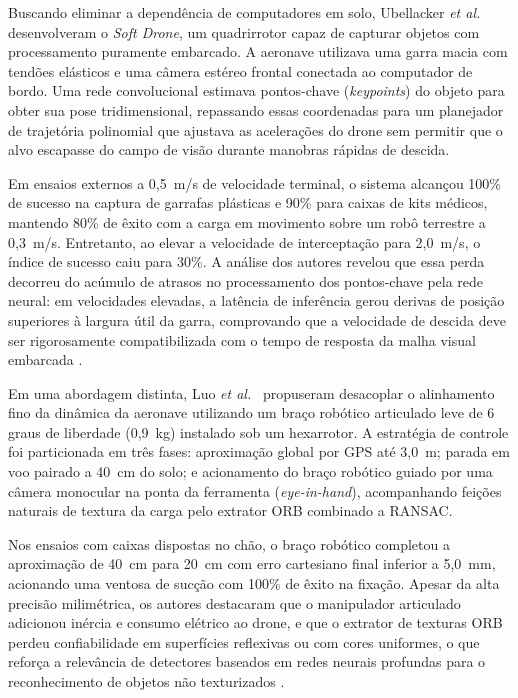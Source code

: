 Buscando eliminar a dependência de computadores em solo, Ubellacker \textit{et al.}~\cite{ubellacker2024} desenvolveram o \textit{Soft Drone}, um quadrirrotor capaz de capturar objetos com processamento puramente embarcado. A aeronave utilizava uma garra macia com tendões elásticos e uma câmera estéreo frontal conectada ao computador de bordo. Uma rede convolucional estimava pontos-chave (\textit{keypoints}) do objeto para obter sua pose tridimensional, repassando essas coordenadas para um planejador de trajetória polinomial que ajustava as acelerações do drone sem permitir que o alvo escapasse do campo de visão durante manobras rápidas de descida.

Em ensaios externos a 0,5~m/s de velocidade terminal, o sistema alcançou 100\% de sucesso na captura de garrafas plásticas e 90\% para caixas de kits médicos, mantendo 80\% de êxito com a carga em movimento sobre um robô terrestre a 0,3~m/s. Entretanto, ao elevar a velocidade de interceptação para 2,0~m/s, o índice de sucesso caiu para 30\%. A análise dos autores revelou que essa perda decorreu do acúmulo de atrasos no processamento dos pontos-chave pela rede neural: em velocidades elevadas, a latência de inferência gerou derivas de posição superiores à largura útil da garra, comprovando que a velocidade de descida deve ser rigorosamente compatibilizada com o tempo de resposta da malha visual embarcada \cite{ubellacker2024}.

Em uma abordagem distinta, Luo \textit{et al.}~\cite{luo2020} propuseram desacoplar o alinhamento fino da dinâmica da aeronave utilizando um braço robótico articulado leve de 6 graus de liberdade (0,9~kg) instalado sob um hexarrotor. A estratégia de controle foi particionada em três fases: aproximação global por GPS até 3,0~m; parada em voo pairado a 40~cm do solo; e acionamento do braço robótico guiado por uma câmera monocular na ponta da ferramenta (\textit{eye-in-hand}), acompanhando feições naturais de textura da carga pelo extrator ORB combinado a RANSAC.

Nos ensaios com caixas dispostas no chão, o braço robótico completou a aproximação de 40~cm para 20~cm com erro cartesiano final inferior a 5,0~mm, acionando uma ventosa de sucção com 100\% de êxito na fixação. Apesar da alta precisão milimétrica, os autores destacaram que o manipulador articulado adicionou inércia e consumo elétrico ao drone, e que o extrator de texturas ORB perdeu confiabilidade em superfícies reflexivas ou com cores uniformes, o que reforça a relevância de detectores baseados em redes neurais profundas para o reconhecimento de objetos não texturizados \cite{luo2020}.

